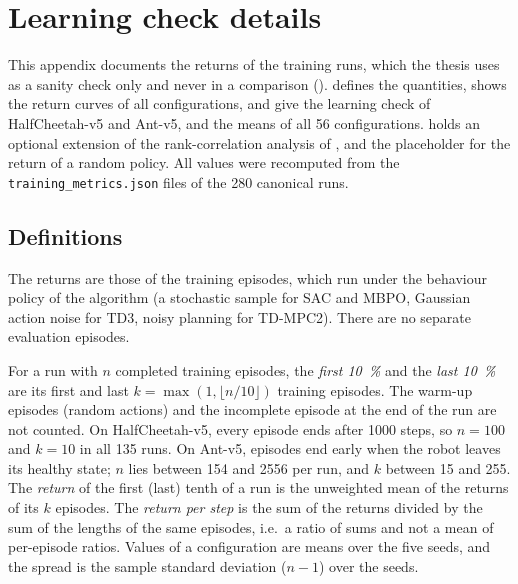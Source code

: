 \chapter{Learning check details}
\label{app:learning}

This appendix documents the returns of the training runs, which the thesis uses as a sanity check only and never in a comparison ().
 defines the quantities,  shows the return curves of all configurations,  and  give the learning check of HalfCheetah-v5 and Ant-v5, and  the means of all \num{56} configurations.
 holds an optional extension of the rank-correlation analysis of , and  the placeholder for the return of a random policy.
All values were recomputed from the \texttt{training\_\allowbreak metrics.json} files of the \num{280} canonical runs.

\section{Definitions}\label{sec:app-learn-def}

The returns are those of the training episodes, which run under the behaviour policy of the algorithm (a stochastic sample for SAC and MBPO, Gaussian action noise for TD3, noisy planning for TD-MPC2).
There are no separate evaluation episodes.

For a run with $n$ completed training episodes, the \emph{first \SI{10}{\percent}} and the \emph{last \SI{10}{\percent}} are its first and last $k=\max(1,\lfloor n/10\rfloor)$ training episodes.
The warm-up episodes (random actions) and the incomplete episode at the end of the run are not counted.
On HalfCheetah-v5, every episode ends after \num{1000} steps, so $n=\num{100}$ and $k=\num{10}$ in all \num{135} runs.
On Ant-v5, episodes end early when the robot leaves its healthy state; $n$ lies between \num{154} and \num{2556} per run, and $k$ between \num{15} and \num{255}.
The \emph{return} of the first (last) tenth of a run is the unweighted mean of the returns of its $k$ episodes.
The \emph{return per step} is the sum of the returns divided by the sum of the lengths of the same episodes, i.e.\ a ratio of sums and not a mean of per-episode ratios.
Values of a configuration are means over the five seeds, and the spread is the sample standard deviation ($n-1$) over the seeds.

